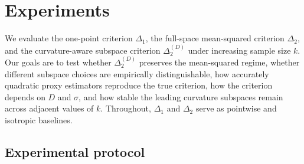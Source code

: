 \documentclass[10pt]{article}
\theoremstyle{plain}
\theoremstyle{remark}
\begin{document}


\section{Experiments}
\label{sec:experiments}

We evaluate the one-point criterion $\Delta_1$, the full-space mean-squared criterion $\Delta_2$, and the curvature-aware subspace criterion $\Delta_2^{(D)}$ under increasing sample size $k$.
Our goals are to test whether $\Delta_2^{(D)}$ preserves the mean-squared regime, whether different subspace choices are empirically distinguishable, how accurately quadratic proxy estimators reproduce the true criterion, how the criterion depends on $D$ and $\sigma$, and how stable the leading curvature subspaces remain across adjacent values of $k$.
Throughout, $\Delta_1$ and $\Delta_2$ serve as pointwise and isotropic baselines.

\subsection{Experimental protocol}
\label{sec:exp-protocol}
\end{document}
